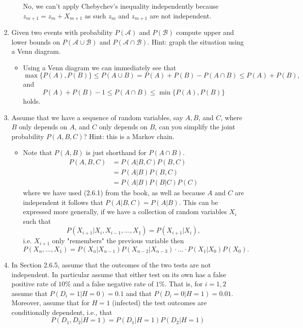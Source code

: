 \documentclass{article}
\begin{document}
\begin{enumerate}
\begin{itemize}
$$			$$
			No, we can't apply Chebychev's inequality independently because $z_{m + 1} = z_m + X_{m + 1}$ as such $z_m$ and $z_{m + 1}$ are not independent.
		\end{itemize}
	\item Given two events with probability $P(\mathcal{A})$ and $P(\mathcal{B})$ compute upper and lower bounds on $P(\mathcal{A} \cup \mathcal{B})$ and $P(\mathcal{A} \cap \mathcal{B})$. Hint: graph the situation using a Venn diagram.
		\begin{itemize}
			\item Using a Venn diagram we can immediately see that
			$$
			\max\{P(A), P(B) \} \leq P(A \cup B) = P(A) + P(B) - P(A \cap B) \leq P(A) + P(B),
			$$
			and
			$$
			P(A) + P(B) - 1 \leq P(A \cap B) \leq \min\{P(A), P(B)\}
			$$
			holds.
		\end{itemize}
	\item Assume that we have a sequence of random variables, say $A, B$, and $C$, where $B$ only depends on $A$, and $C$ only depends on $B$, can you simplify the joint probability $P(A, B, C)$? Hint: this is a Markov chain.
		\begin{itemize}
			\item Note that $P(A, B)$ is just shorthand for $P(A \cap B)$.
			\begin{align*}
			P(A, B, C) &= P(A|B, C) P(B, C) \\
			&= P(A|B) P(B, C) \\
			&= P(A|B) P(B|C) P(C)
			\end{align*}
			where we have used (2.6.1) from the book, as well as because $A$ and $C$ are independent it follows that $P(A|B, C) = P(A|B)$. This can be expressed more generally, if we have a collection of random variables $X_i$ such that
			$$
			P(X_{i + 1} | X_i, X_{i - 1}, \dots, X_1) = P(X_{i + 1}| X_i),
			$$
			i.e. $X_{i + 1}$ only "remembers" the previous variable then
			$$
			P(X_n, \dots, X_1) = P(X_n|X_{n - 1})P(X_{n - 2}|X_{n - 3})\cdot \dots \cdot P(X_1|X_0)P(X_0).
			$$
		\end{itemize}
	\item In Section 2.6.5, assume that the outcomes of the two tests are not independent. In particular assume that either test on its own has a false positive rate of $10\%$ and a false negative rate of $1\%$. That is, for $i = 1, 2$ assume that $P(D_i = 1 | H = 0) = 0.1$ and that $P(D_i = 0 | H = 1) = 0.01$. Moreover, assume that for $H = 1$ (infected) the test outcomes are conditionally dependent, i.e., that 
	$$
	P(D_1, D_2|H = 1) = P(D_1 | H = 1)P(D_2 | H = 1)
$$
\end{enumerate}
\end{document}
